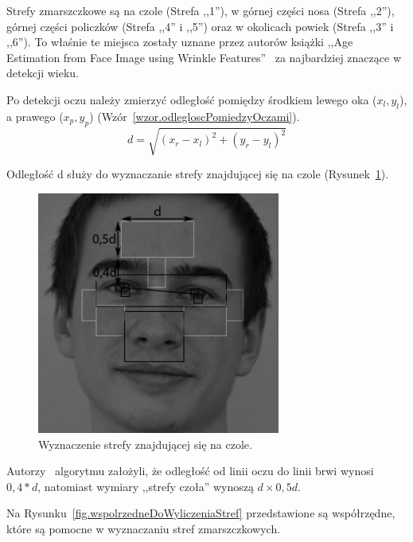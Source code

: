\documentclass[a4paper,twoside,12pt]{book}
\begin{document}
    Strefy zmarszczkowe są na czole (Strefa ,,1''), w górnej części nosa (Strefa ,,2''), górnej części policzków
    (Strefa ,,4'' i ,,5'') oraz w okolicach powiek (Strefa ,,3'' i ,,6'').
    To właśnie te miejsca zostały uznane przez autorów książki ,,Age Estimation from Face Image using Wrinkle
    Features''~\cite{wrinkleFeatures} za najbardziej znaczące w detekcji wieku.

    Po detekcji oczu należy zmierzyć odległość pomiędzy środkiem lewego oka ($x_{l},y_{l}$),
    a prawego ($x_{p},y_{p}$)
    (Wzór~\ref{wzor.odlegloscPomiedzyOczami}).
    \large
    \begin{equation}
        d= \sqrt{\left ( x_{r} - x_{l} \right )^{2}+\left (y_{r} - y_{l}  \right )^{2}}
        \label{wzor.odlegloscPomiedzyOczami}
    \end{equation}
    \normalsize

    Odległość d służy do wyznaczanie strefy znajdującej się na czole (Rysunek~\ref{fig.wyznaczenieCzola}).


    \begin{figure}
        \centering
        \includegraphics[width=8cm]{Obrazy/wyliczenieCzolka.jpg}
        \caption{Wyznaczenie strefy znajdującej się na czole.}
        \label{fig.wyznaczenieCzola}
    \end{figure}

    Autorzy~\cite{wrinkleFeatures} algorytmu założyli, że odległość od linii oczu do linii brwi wynosi $0,4 * d$,
    natomiast wymiary ,,strefy czoła'' wynoszą $d \times 0,5d$.

    Na Rysunku~\ref{fig.wspolrzedneDoWyliczeniaStref} przedstawione są współrzędne, które są pomocne w wyznaczaniu
    stref zmarszczkowych.
\end{document}
